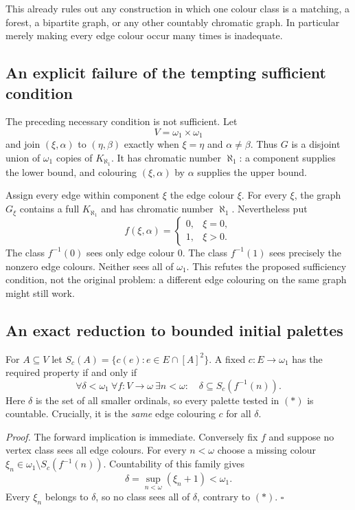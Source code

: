 This already rules out any construction in which one colour class is a matching, a forest, a bipartite graph, or any other countably chromatic graph. In particular merely making every edge colour occur many times is inadequate.

\subsection{An explicit failure of the tempting sufficient condition}
The preceding necessary condition is not sufficient. Let
\[
V=\omega_1\times\omega_1
\]
and join $(\xi,\alpha)$ to $(\eta,\beta)$ exactly when $\xi=\eta$ and $\alpha\ne\beta$. Thus $G$ is a disjoint union of $\omega_1$ copies of $K_{\aleph_1}$. It has chromatic number $\aleph_1$: a component supplies the lower bound, and colouring $(\xi,\alpha)$ by $\alpha$ supplies the upper bound.

Assign every edge within component $\xi$ the edge colour $\xi$. For every $\xi$, the graph $G_\xi$ contains a full $K_{\aleph_1}$ and has chromatic number $\aleph_1$. Nevertheless put
\[
f(\xi,\alpha)=
\begin{cases}0,&\xi=0,\\1,&\xi>0.\end{cases}
\]
The class $f^{-1}(0)$ sees only edge colour $0$. The class $f^{-1}(1)$ sees precisely the nonzero edge colours. Neither sees all of $\omega_1$. This refutes the proposed sufficiency condition, not the original problem: a different edge colouring on the same graph might still work.

\subsection{An exact reduction to bounded initial palettes}
For $A\subseteq V$ let $S_c(A)=\{c(e):e\in E\cap[A]^2\}$. A fixed $c:E\to\omega_1$ has the required property if and only if
\[
\forall\delta<\omega_1\ \forall f:V\to\omega\ \exists n<\omega:
\quad \delta\subseteq S_c(f^{-1}(n)).\tag{*}
\]
Here $\delta$ is the set of all smaller ordinals, so every palette tested in $(*)$ is countable. Crucially, it is the \emph{same} edge colouring $c$ for all $\delta$.

\textit{Proof.} The forward implication is immediate. Conversely fix $f$ and suppose no vertex class sees all edge colours. For every $n<\omega$ choose a missing colour $\xi_n\in\omega_1\setminus S_c(f^{-1}(n))$. Countability of this family gives
\[
\delta=\sup_{n<\omega}(\xi_n+1)<\omega_1.
\]
Every $\xi_n$ belongs to $\delta$, so no class sees all of $\delta$, contrary to $(*)$. \hfill$\square$

